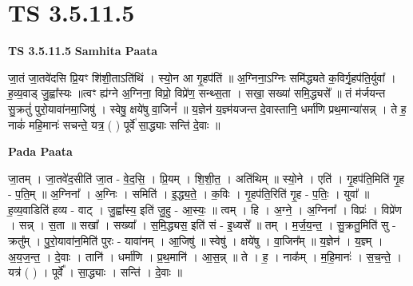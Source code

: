 \documentclass[17pt]{extarticle}
\begin{document}
\section*{ TS 3.5.11.5 }

\textbf{TS 3.5.11.5 } \newline
\textbf{Samhita Paata} \newline

जा॒तं जा॒तवे॑दसि प्रि॒यꣳ शि॑शी॒ताऽति॑थिं । स्यो॒न आ गृ॒हप॑तिं ॥ अ॒ग्निना॒ऽग्निः समि॑द्ध्यते क॒विर्गृ॒हप॑ति॒र्युवा᳚ । ह॒व्य॒वाड् जु॒ह्वा᳚स्यः ॥त्वꣳ ह्य॑ग्ने अ॒ग्निना॒ विप्रो॒ विप्रे॑ण॒ सन्थ्स॒ता । सखा॒ सख्या॑ समि॒द्ध्यसे᳚ ॥ तं म॑र्जयन्त सु॒क्रतुं॑ पुरो॒यावा॑नमा॒जिषु॑ । स्वेषु॒ क्षये॑षु वा॒जिनं᳚ ॥ य॒ज्ञेन॑ य॒ज्ञ्म॑यजन्त दे॒वास्तानि॒ धर्मा॑णि प्रथ॒मान्या॑सन्न् । ते ह॒ नाकं॑ महि॒मानः॑ सचन्ते॒ यत्र॒ ( ) पूर्वे॑ सा॒द्ध्याः सन्ति॑ दे॒वाः ॥ \newline

\textbf{Pada Paata} \newline

जा॒तम् । जा॒तवे॑द॒सीति॑ जा॒त - वे॒द॒सि॒ । प्रि॒यम् । शि॒शी॒त॒ । अति॑थिम् ॥ स्यो॒ने । एति॑ । गृ॒हप॑ति॒मिति॑ गृ॒ह - प॒ति॒म् ॥ अ॒ग्निना᳚ । अ॒ग्निः । समिति॑ । इ॒द्ध्य॒ते॒ । क॒विः । गृ॒हप॑ति॒रिति॑ गृ॒ह - प॒तिः॒ । युवा᳚ ॥ ह॒व्य॒वाडिति॑ हव्य - वाट् । जु॒ह्वा᳚स्य॒ इति॑ जु॒हु - आ॒स्यः॒ ॥ त्वम् । हि । अ॒ग्ने॒ । अ॒ग्निना᳚ । विप्रः॑ । विप्रे॑ण । सन्न् । स॒ता ॥ सखा᳚ । सख्या᳚ । स॒मि॒द्ध्यस॒ इति॑ सं - इ॒ध्यसे᳚ ॥ तम् । म॒र्ज॒य॒न्त॒ । सु॒क्रतु॒मिति॑ सु - क्रतु᳚म् । पु॒रो॒यावा॑न॒मिति॑ पुरः - यावा॑नम् । आ॒जिषु॑ ॥ स्वेषु॑ । क्षये॑षु । वा॒जिन᳚म् ॥ य॒ज्ञेन॑ । य॒ज्ञ्म् । अ॒य॒ज॒न्त॒ । दे॒वाः । तानि॑ । धर्मा॑णि । प्र॒थ॒मानि॑ । आ॒स॒न्न् ॥ ते । ह॒ । नाक᳚म् । म॒हि॒मानः॑ । स॒च॒न्ते॒ । यत्र॑ ( ) । पूर्वे᳚ । सा॒द्ध्याः । सन्ति॑ । दे॒वाः ॥  \newline
\end{document}
